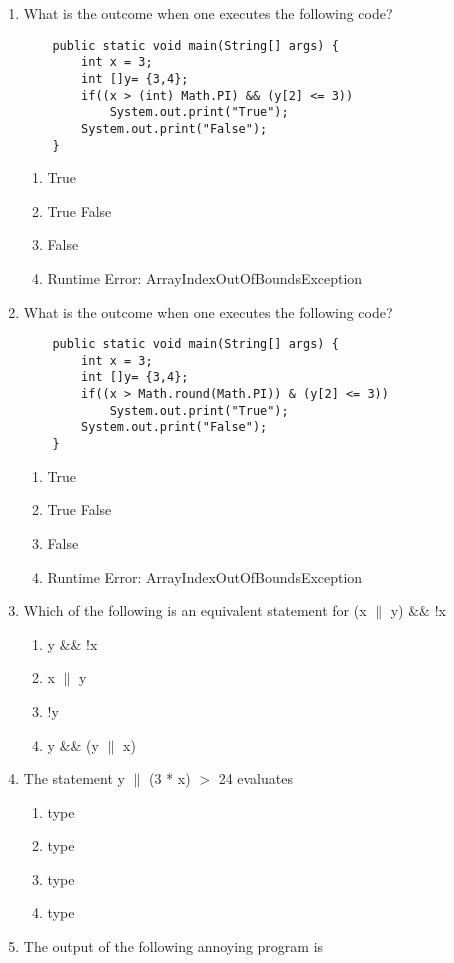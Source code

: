 \documentclass[11pt,fleqn]{article}
\begin{document}
\begin{enumerate}
\begin{enumerate}
	\end{enumerate}
\item What is the outcome when one executes the following code?
	\begin{verbatim}
	public static void main(String[] args) {
		int x = 3;
		int []y= {3,4};
		if((x > (int) Math.PI) && (y[2] <= 3)) 
			System.out.print("True");
		System.out.print("False");
	}
	\end{verbatim}
	\begin{enumerate}
	\item True
	\item True False
	\item False
	\item Runtime Error: ArrayIndexOutOfBoundsException
	\end{enumerate}
\item What is the outcome when one executes the following code?
	\begin{verbatim}
	public static void main(String[] args) {
		int x = 3;
		int []y= {3,4};
		if((x > Math.round(Math.PI)) & (y[2] <= 3)) 
			System.out.print("True");
		System.out.print("False");
	}
	\end{verbatim}
	\begin{enumerate}
	\item True
	\item True False
	\item False
	\item Runtime Error: ArrayIndexOutOfBoundsException
	\end{enumerate}
\item Which of the following is an equivalent statement for (x $\|$ y) $\&\&$ !x
	\begin{enumerate}
	\item y \&\& !x
	\item x $\|$ y
	\item !y
	\item y \&\& (y $\|$ x)
	\end{enumerate}
\newpage
\item The statement y $\|$ (3 * x) $ > $ 24 evaluates
	\begin{enumerate}
	\item type 
	\item type 
	\item type 
	\item type 
	\end{enumerate}
\item The output of the following annoying program is

\end{enumerate}
\end{document}
